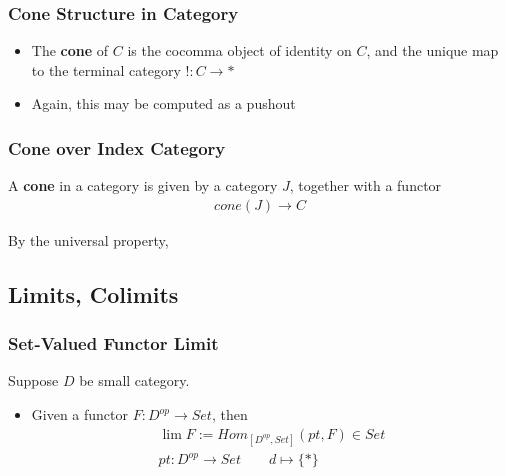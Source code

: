 \documentclass[Total.tex]{subfiles}
\begin{document}
			\subsubsection{Cone Structure in Category}
			\begin{Def}
				\begin{itemize}
					\item The \textbf{cone} of $C$ is the cocomma object of identity on $C$, and the unique map to the terminal category $!:C\rightarrow *$
					\begin{center}{\small
							}
					\end{center}
					
					
					\item Again, this may be computed as a pushout
					\begin{center}
					\end{center}
				\end{itemize}
			\end{Def}
			
			\subsubsection{Cone over Index Category}
			\begin{Def}
				A \textbf{cone} in a category is given by a category $J$, together with a functor 
				\begin{gather*}
					cone(J)\rightarrow C
				\end{gather*}
				
				By the universal property, 
			\end{Def}
			
			
			\subsection{Limits, Colimits}
				\subsubsection{Set-Valued Functor Limit}
				\begin{Def} Suppose $D$ be small category. 
					\begin{itemize}
						\item Given a functor $F:D^{op}\rightarrow Set$, then
						\begin{gather*}
							\lim F:=Hom_{[D^{op},Set]}(pt,F)\in Set\\
							pt:D^{op}\rightarrow Set\qquad d\mapsto \{*\}
						\end{gather*}
					\end{itemize}
				\end{Def}
				
\end{document}
